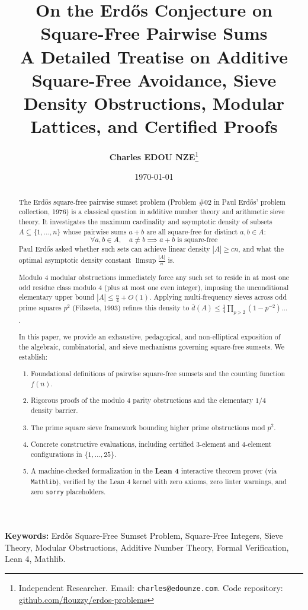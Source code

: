 \documentclass[11pt,a4paper]{article}
\title{\textbf{\Large On the Erd\H{o}s Conjecture on Square-Free Pairwise Sums}\\[0.5em]
\large A Detailed Treatise on Additive Square-Free Avoidance, Sieve Density Obstructions, Modular Lattices, and Certified Proofs}
\author{\textbf{Charles EDOU NZE}\thanks{Independent Researcher. Email: \texttt{charles@edounze.com}. Code repository: \href{https://github.com/flouzzy/erdos-problems}{github.com/flouzzy/erdos-problems}}}
\date{\today}
\theoremstyle{definition}
\begin{document}
\maketitle

\begin{abstract}
The Erd\H{o}s square-free pairwise sumset problem (Problem \#02 in Paul Erd\H{o}s' problem collection, 1976) is a classical question in additive number theory and arithmetic sieve theory. It investigates the maximum cardinality and asymptotic density of subsets $A \subseteq \{1, \dots, n\}$ whose pairwise sums $a + b$ are all square-free for distinct $a, b \in A$:
\[ \forall a, b \in A, \quad a \ne b \implies a + b \text{ is square-free} \]
Paul Erd\H{o}s asked whether such sets can achieve linear density $|A| \ge c n$, and what the optimal asymptotic density constant $\limsup \frac{|A|}{n}$ is.

Modulo 4 modular obstructions immediately force any such set to reside in at most one odd residue class modulo 4 (plus at most one even integer), imposing the unconditional elementary upper bound $|A| \le \frac{n}{4} + O(1)$. Applying multi-frequency sieves across odd prime squares $p^2$ (Filaseta, 1993) refines this density to $\bar{d}(A) \le \frac{1}{4} \prod_{p > 2} (1 - p^{-2}) \dots$.

In this paper, we provide an exhaustive, pedagogical, and non-elliptical exposition of the algebraic, combinatorial, and sieve mechanisms governing square-free sumsets. We establish:
\begin{enumerate}
    \item Foundational definitions of pairwise square-free sumsets and the counting function $f(n)$.
    \item Rigorous proofs of the modulo 4 parity obstructions and the elementary $1/4$ density barrier.
    \item The prime square sieve framework bounding higher prime obstructions mod $p^2$.
    \item Concrete constructive evaluations, including certified 3-element and 4-element configurations in $\{1, \dots, 25\}$.
    \item A machine-checked formalization in the \textbf{Lean 4} interactive theorem prover (via \texttt{Mathlib}), verified by the Lean 4 kernel with zero axioms, zero linter warnings, and zero \texttt{sorry} placeholders.
\end{enumerate}
\end{abstract}

\vspace{0.5em}
\noindent\textbf{Keywords:} Erd\H{o}s Square-Free Sumset Problem, Square-Free Integers, Sieve Theory, Modular Obstructions, Additive Number Theory, Formal Verification, Lean 4, Mathlib.
\end{document}

